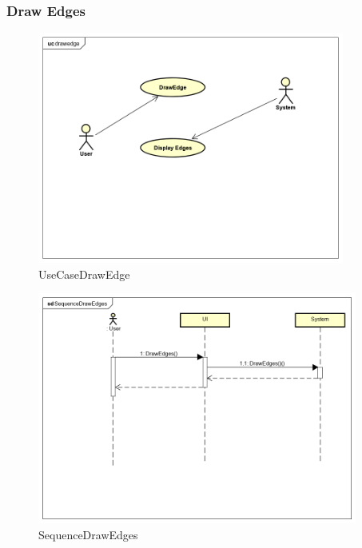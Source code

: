 \documentclass[a4paper,10pt]{article}
\begin{document}
\subsubsection{Draw Edges}
\begin{figure}[H]
		\centering
		\includegraphics[height = 3in]{UseCaseDrawEdge.png}
		\caption[Optional caption]{UseCaseDrawEdge}
		\label{fig:UseCaseDrawEdge}
	\end{figure}
	
	\begin{figure}[H]
		\centering
		\includegraphics[height = 3in]{SequenceDrawEdges.png}
		\caption[Optional caption]{SequenceDrawEdges}
		\label{fig:SequenceDrawEdges}
	\end{figure}
	
\end{document}
